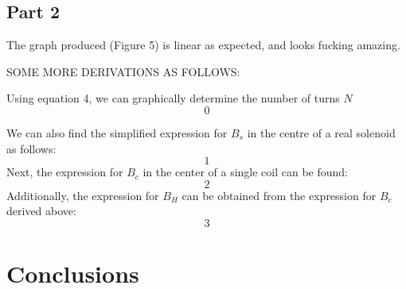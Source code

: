 \documentclass[letterpaper]{article}
\begin{document}
\subsection{Part 2}


The graph produced (Figure 5) is linear as expected, and looks fucking amazing.


 SOME MORE DERIVATIONS AS FOLLOWS:

Using equation 4, we can graphically determine the number of turns $N$
$$0$$

We can also find the simplified expression for $B_s$ in the centre of a real solenoid as follows:
$$1$$
Next, the expression for $B_c$ in the center of a single coil can be found:
$$2$$
Additionally, the expression for $B_H$ can be obtained from the expression for $B_c$ derived above:
$$3$$

\section{Conclusions}
\end{document}
